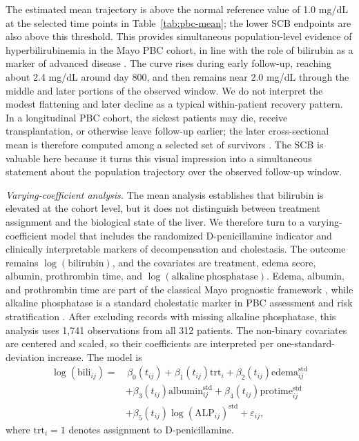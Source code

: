 \documentclass[12pt]{article} %
\theoremstyle{definition}
\begin{document}
The estimated mean trajectory is above the normal reference value of
1.0 mg/dL at the selected time points in Table~\ref{tab:pbc-mean}; the lower
SCB endpoints are also above this threshold. This provides simultaneous
population-level evidence of hyperbilirubinemia in the Mayo PBC cohort, in
line with the role of bilirubin as a marker of advanced disease
\citep{Dickson1989,Prince2004,Corpechot2008}. The curve rises during early
follow-up, reaching about 2.4 mg/dL around day 800, and then remains near
2.0 mg/dL through the middle and later portions of the observed window. We do
not interpret the modest flattening and later decline as a typical
within-patient recovery pattern. In a longitudinal PBC cohort, the sickest
patients may die, receive transplantation, or otherwise leave follow-up earlier;
the later cross-sectional mean is therefore computed among a selected set of
survivors \citep{Murtaugh1994,WulfsohnTsiatis1997}. The SCB is valuable here
because it turns this visual impression into a simultaneous statement about
the population trajectory over the observed follow-up window.

\emph{Varying-coefficient analysis.}
The mean analysis establishes that bilirubin is elevated at the cohort level,
but it does not distinguish between treatment assignment and the biological
state of the liver. We therefore turn to a varying-coefficient model that
includes the randomized D-penicillamine indicator and clinically interpretable
markers of decompensation and cholestasis. The outcome remains
\(\log(\mathrm{bilirubin})\), and the covariates are treatment, edema score,
albumin, prothrombin time, and \(\log(\mathrm{alkaline\ phosphatase})\). Edema,
albumin, and prothrombin time are part of the classical Mayo prognostic
framework \citep{Dickson1989,Murtaugh1994}, while alkaline phosphatase is a
standard cholestatic marker in PBC assessment and risk stratification
\citep{Lindor2019,Lammers2014,Carbone2016}. After excluding records with
missing alkaline phosphatase, this analysis uses 1,741 observations from all
312 patients. The non-binary covariates are centered and scaled, so their
coefficients are interpreted per one-standard-deviation increase. The model is
\begin{equation}
\label{eq:pbc-vcm-model}
\begin{split}
\log(\mathrm{bili}_{ij})
=&\,\beta_0(t_{ij})+\beta_1(t_{ij})\mathrm{trt}_i
 +\beta_2(t_{ij})\mathrm{edema}^{\mathrm{std}}_{ij} \\
&+\beta_3(t_{ij})\mathrm{albumin}^{\mathrm{std}}_{ij}
 +\beta_4(t_{ij})\mathrm{protime}^{\mathrm{std}}_{ij} \\
&+\beta_5(t_{ij})\log(\mathrm{ALP}_{ij})^{\mathrm{std}}
 +\varepsilon_{ij},
\end{split}
\end{equation}
where \(\mathrm{trt}_i=1\) denotes assignment to D-penicillamine.
\end{document}

